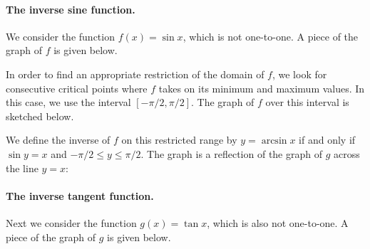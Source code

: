 \documentclass[12pt]{report}
\begin{document}
\paragraph{The inverse sine function.} We consider the function $f(x)=\sin x$, which is not one-to-one. A piece of the graph of $f$ is given below.

\begin{center}
\end{center}

In order to find an appropriate restriction of the domain of $f$, we look for consecutive critical points where $f$ takes on its minimum and maximum values. In this case, we use the interval $[-\pi/2,\pi/2]$. The graph of $f$ over this interval is sketched below.

\begin{center}
\end{center}

We define the inverse of $f$ on this restricted range by $y=\arcsin x$ if and only if $\sin y=x$ and $-\pi/2\leq y\leq \pi/2$. The graph is a reflection of the graph of $g$ across the line $y=x$:

\begin{center}
\end{center}

\paragraph{The inverse tangent function.} Next we consider the function $g(x)=\tan x$, which is also not one-to-one. A piece of the graph of $g$ is given below.

\begin{center}
\end{center}
\end{document}
